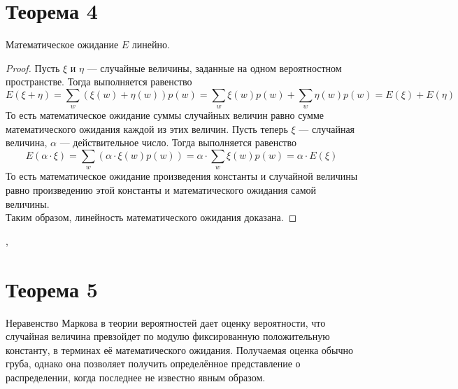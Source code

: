 \documentclass[a4paper,12pt]{article}
\begin{document}
	\section{Теорема 4}
	\begin{theorem}
		Математическое ожидание $E$ линейно.
	\end{theorem}
	\begin{proof}
	Пусть $\xi$ и $\eta$ --- случайные величины, заданные на одном вероятностном пространстве. Тогда выполняется равенство $$E(\xi+\eta)=\sum_w(\xi(w)+\eta(w))p(w)=\sum_w\xi(w)p(w)+\sum_w\eta(w)p(w)=E(\xi)+E(\eta)$$
	То есть математическое ожидание суммы случайных величин равно сумме математического ожидания каждой из этих величин. Пусть теперь $\xi$ --- случайная величина, $\alpha$ --- действительное число. Тогда выполняется равенство 
	$$E(\alpha\cdot\xi)=\sum_w(\alpha\cdot\xi(w)p(w))=\alpha\cdot\sum_w\xi(w)p(w)=\alpha\cdot E(\xi)$$
	То есть математическое ожидание произведения константы и случайной величины равно произведению этой константы и математического ожидания самой величины.\\
	Таким образом, линейность математического ожидания доказана.
	\end{proof}
\sep
    \section {Теорема 5}
   Неравенство Маркова в теории вероятностей дает оценку вероятности, что случайная величина превзойдет по модулю фиксированную положительную константу, в терминах её математического ожидания. Получаемая оценка обычно груба, однако она позволяет получить определённое представление о распределении, когда последнее не известно явным образом.
   
\end{document}
